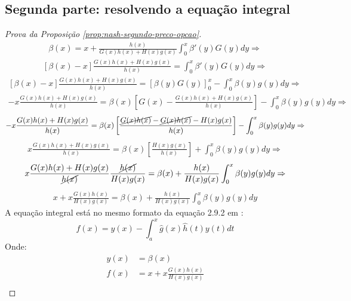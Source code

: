 \subsection{Segunda parte: resolvendo a equação integral}
\begin{proof}[Prova da Proposição \ref{prop:nash-segundo-preco-opcao}]
	\begin{align*}
		\beta(x) = x + \frac{h(x)}{G(x)h(x) + H(x)g(x)} \int_0^x \beta'(y)G(y)dy \Rightarrow
	\end{align*}
	\begin{align*}
		\left[ \beta(x) - x \right] \frac{G(x)h(x) + H(x)g(x)}{h(x)} = \int_0^x \beta'(y)G(y)dy \Rightarrow
	\end{align*}
	\begin{align*}
		\left[ \beta(x) - x \right] \frac{G(x)h(x) + H(x)g(x)}{h(x)} = \left[ \beta(y)G(y) \right]_0^x - \int_0^x \beta(y)g(y)dy \Rightarrow
	\end{align*}
	\begin{align*}
		-x \frac{G(x)h(x) + H(x)g(x)}{h(x)} = \beta(x) \left[ G(x) - \frac{G(x)h(x) + H(x)g(x)}{h(x)} \right] - \int_0^x \beta(y)g(y)dy \Rightarrow
	\end{align*}
	\begin{align*}
		-x \frac{G(x)h(x) + H(x)g(x)}{h(x)} = \beta(x) \left[ \frac{\cancel{G(x)h(x)} - \cancel{G(x)h(x)} - H(x)g(x)}{h(x)} \right] - \int_0^x \beta(y)g(y)dy \Rightarrow
	\end{align*}
	\begin{align*}
		x \frac{G(x)h(x) + H(x)g(x)}{h(x)} = \beta(x) \left[ \frac{H(x)g(x)}{h(x)} \right] + \int_0^x \beta(y)g(y)dy \Rightarrow
	\end{align*}
	\begin{align*}
		x \frac{G(x)h(x) + H(x)g(x)}{\cancel{h(x)}}\frac{\cancel{h(x)}}{H(x)g(x)} = \beta(x) + \frac{h(x)}{H(x)g(x)}\int_0^x \beta(y)g(y)dy \Rightarrow
	\end{align*}
	\begin{align*}
		x + x \frac{G(x)h(x)}{H(x)g(x)} = \beta(x) + \frac{h(x)}{H(x)g(x)}\int_0^x \beta(y)g(y)dy
	\end{align*}
	A equação integral está no mesmo formato da equação 2.9.2 em \citet{polyanin1998handbook}:
	\begin{equation*}
		f(x) = y(x) - \int_a^x \widehat{g}(x)\widehat{h}(t)y(t)dt
	\end{equation*}
	Onde:
	\begin{align*}
		y(x) & = \beta(x) \\
		f(x) & = x + x \frac{G(x)h(x)}{H(x)g(x)} \\

\end{align*}
\end{proof}
